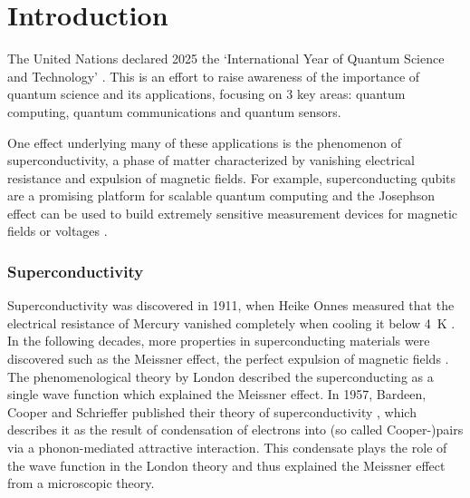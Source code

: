 \documentclass[../main.tex]{subfiles}
\begin{document}
\chapter{Introduction}\label{ch:introduction}

The United Nations declared 2025 the `International Year of Quantum Science and Technology' \cite{unitednationsInternationalYearQuantum2024}.
This is an effort to raise awareness of the importance of quantum science and its applications, focusing on 3 key areas: quantum computing, quantum communications and quantum sensors.

One effect underlying many of these applications is the phenomenon of superconductivity, a phase of matter characterized by vanishing electrical resistance and expulsion of magnetic fields.
For example, superconducting qubits are a promising platform for scalable quantum computing \cite{huangSuperconductingQuantumComputing2020, aruteQuantumSupremacyUsing2019} and the Josephson effect \cite{josephsonPossibleNewEffects1962} can be used to build extremely sensitive measurement devices for magnetic fields \cite{faleyHighTcSQUIDBiomagnetometers2017} or voltages \cite{klushinPresentFutureHightemperature2020}.

\subsection*{Superconductivity}

Superconductivity was discovered in 1911, when Heike Onnes measured that the electrical resistance of Mercury vanished completely when cooling it below \qty{4}{\kelvin} \cite{onnesFurtherExperimentsLiquid1991}.
In the following decades, more properties in superconducting materials were discovered such as the Meissner effect, the perfect expulsion of magnetic fields \cite{meissnerNeuerEffektBei1933}.
The phenomenological theory by London described the superconducting as a single wave function \cite{londonNewConceptionSupraconductivity1937} which explained the Meissner effect.
In 1957, Bardeen, Cooper and Schrieffer published their theory of superconductivity \cite{bardeenTheorySuperconductivity1957}, which describes it as the result of condensation of electrons into (so called Cooper-)pairs via a phonon-mediated attractive interaction.
This condensate plays the role of the wave function in the London theory and thus explained the Meissner effect from a microscopic theory.
\end{document}
